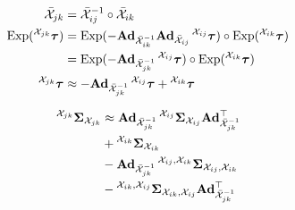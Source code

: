 \begin{align}
    \bar{\cX}_{jk} &= \bar{\cX}_{ij}^{-1} \circ \bar{\cX}_{ik}\\
    \Exp(\prescript{\cX_{jk}}{}{\vectau}) &= \Exp(- \mAd_{\bar{\cX}_{ik}^{-1}} \mAd_{\bar{\cX}_{ij}} \prescript{\cX_{ij}}{}{\vectau}) \circ \Exp(\prescript{\cX_{ik}}{}{\vectau})\\
    &= \Exp(- \mAd_{\bar{\cX}_{jk}^{-1}} \prescript{\cX_{ij}}{}{\vectau}) \circ \Exp(\prescript{\cX_{ik}}{}{\vectau})\\
    \prescript{\cX_{jk}}{}{\vectau} &\approx - \mAd_{\bar{\cX}_{jk}^{-1}} \prescript{\cX_{ij}}{}{\vectau} + \prescript{\cX_{ik}}{}{\vectau}
\end{align}

\begin{align}
  \prescript{\cX_{jk}}{}{\matSigma}_{\cX_{jk}} &\approx \mAd_{\bar{\cX}_{jk}^{-1}} \prescript{\cX_{ij}}{}{\matSigma_{\cX_{ij}}} \mAd_{\bar{\cX}_{jk}^{-1}}\trans\\
    &+ \prescript{\cX_{ik}}{}{\matSigma_{\cX_{ik}}}\\
    &- \mAd_{\bar{\cX}_{jk}^{-1}} \prescript{\cX_{ij}, \cX_{ik}}{}{\matSigma_{\cX_{ij}, \cX_{ik}}}\\
    &- \prescript{\cX_{ik}, \cX_{ij}}{}{\matSigma_{\cX_{ik}, \cX_{ij}}} \mAd_{\bar{\cX}_{jk}^{-1}}\trans
\end{align}